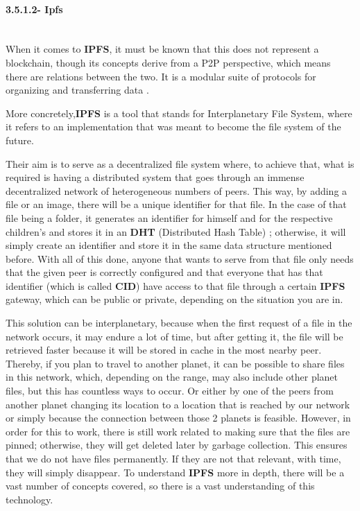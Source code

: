 \paragraph{3.5.1.2- Ipfs}\mbox{}\\
When it comes to \textbf{IPFS}, it must be known that this does not represent a blockchain, though its concepts derive from a P2P perspective, which means there are relations between the two. It is a modular suite of protocols for organizing and transferring data \cite{ipfs}.

More concretely,\textbf{IPFS} is a tool that stands for Interplanetary File System, where it refers to an implementation that was meant to become the file system of the future.

Their aim is to serve as a decentralized file system where, to achieve that, what is required is having a distributed system that goes through an immense decentralized network of heterogeneous numbers of peers. This way, by adding a file or an image, there will be a unique identifier for that file. In the case of that file being a folder, it generates an identifier for himself and for the respective children's and stores it in an \textbf{DHT} (Distributed Hash Table) \cite{dht}; otherwise, it will simply create an identifier and store it in the same data structure mentioned before. With all of this done, anyone that wants to serve from that file only needs that the given peer is correctly configured and that everyone that has that identifier (which is called \textbf{CID}) have access to that file through a certain \textbf{IPFS} gateway, which can be public or private, depending on the situation you are in.

This solution can be interplanetary, because when the first request of a file in the network occurs, it may endure a lot of time, but after getting it, the file will be retrieved faster because it will be stored in cache in the most nearby peer. Thereby, if you plan to travel to another planet, it can be possible to share files in this network, which, depending on the range, may also include other planet files, but this has countless ways to occur. Or either by one of the peers from another planet changing its location to a location that is reached by our network or simply because the connection between those 2 planets is feasible. However, in order for this to work, there is still work related to making sure that the files are pinned; otherwise, they will get deleted later by garbage collection. This ensures that we do not have files permanently. If they are not that relevant, with time, they will simply disappear. To understand \textbf{IPFS} more in depth, there will be a vast number of concepts covered, so there is a vast understanding of this technology.

